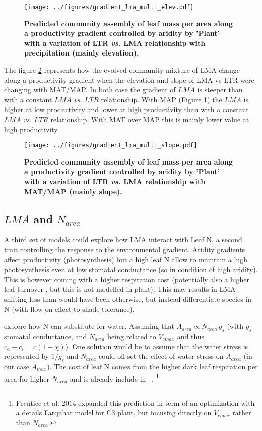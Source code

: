 \documentclass[a4paper,11pt]{article}
\begin{document}
\begin{figure}[ht]
\centering
\texttt{[image: ../figures/gradient\_lma\_multi\_elev.pdf]}
\caption{\textbf{Predicted community assembly of leaf mass per area
    along a productivity gradient controlled by aridity by 'Plant'
    with a variation of LTR \textit{vs.} LMA relationship with precipitation (mainly elevation).}
\label{fig:lma_map}}
\end{figure}

The figure \ref{fig:lma_mat_o_map} represents how the evolved
community mixture of LMA change along a productivity gradient when the
elevation and slope of LMA vs LTR were changing with MAT/MAP. In both case the gradient of $LMA$ is steeper than
with a constant $LMA$ \textit{vs.} $LTR$ relationship. With MAP (Figure \ref{fig:lma_map}) the $LMA$ is
higher at low productivity and lower at high productivity than with a
constant $LMA$ \textit{vs.} $LTR$ relationship. With MAT over MAP this
is mainly lower value at high productivity.

\begin{figure}[ht]
\centering
\texttt{[image: ../figures/gradient\_lma\_multi\_slope.pdf]}
\caption{\textbf{Predicted community assembly of leaf mass per area
    along a productivity gradient controlled by aridity by 'Plant'
    with a variation of LTR \textit{vs.} LMA relationship with MAT/MAP
    (mainly slope).}
\label{fig:lma_mat_o_map}}
\end{figure}


\clearpage

\subsection{$LMA$ and $N_{area}$}

A third set of models could explore how LMA interact with Leaf N, a second trait controlling the response to the environmental gradient. Aridity gradients affect productivity (photosynthesis) but a
high leaf N allow to maintain a high photosynthesis even at low
stomatal conductance (so in condition of high aridity). This is
however coming with a higher respiration cost (potentially also a higher leaf turnover \citep{Wright-2002a,Wright-2002b}, but this is not modelled in plant). This may results in LMA shifting less than would have been otherwise, but instead differentiate species in N (with flow on effect to shade tolerance).


 \citet{Wright-2003} explore how N can substitute for water. Assuming that $A_{area} \propto N_{area} \, g_s$ (with $g_s$ stomatal conductance, and $N_{area}$ being related to $V_{cmax}$ and thus $c_a - c_i = c(1-\chi)$). One solution would be to assume that the water stress is represented by $1/g_s$ and $N_{area}$ could off-set the effect of water stress on $A_{area}$ (in our case $A_{max}$). The cost of leaf N comes from the higher dark leaf respiration per area for higher $N_{area}$ and is already include in \plant\ . \footnote{Prentice et al. 2014 expanded this prediction in term of an optimization with a details Farquhar model for C3 plant, but focusing directly on $V_{cmax}$ rather than $N_{area}$.}
\end{document}
